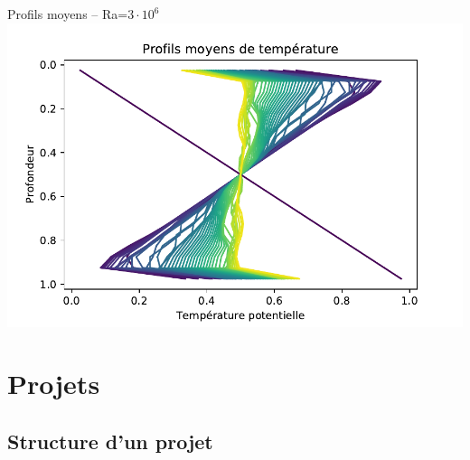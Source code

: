 \documentclass[9pt]{beamer}
\begin{document}
\begin{frame}{Profils moyens -- Ra=$3\cdot 10^6$}
\includegraphics[width=\textwidth]{fig/profils_moyens_Ra3e6.pdf}
\end{frame}

\section{Projets}

\subsection{Structure d'un projet}
\end{document}
